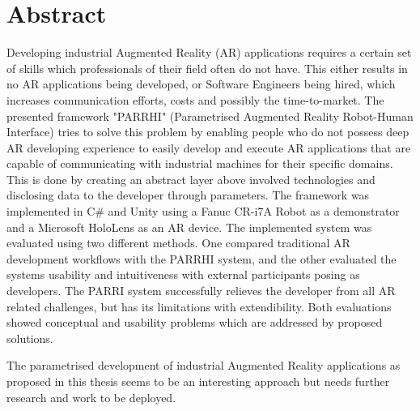 \chapter*{Abstract}\label{Chap:Abstract}

Developing industrial Augmented Reality (AR) applications requires a certain set of skills which professionals of their field often do not have. This either results in no AR applications being developed, or Software Engineers being hired, which increases communication efforts, costs and possibly the time-to-market. The presented framework "PARRHI" (Parametrised Augmented Reality Robot-Human Interface) tries to solve this problem by enabling people who do not possess deep AR developing experience to easily develop and execute AR applications that are capable of communicating with industrial machines for their specific domains. This is done by creating an abstract layer above involved technologies and disclosing data to the developer through parameters. The framework was implemented in C\# and Unity using a Fanuc CR-i7A Robot as a demonstrator and a Microsoft HoloLens as an AR device. The implemented system was evaluated using two different methods. One compared traditional AR development workflows with the PARRHI system, and the other evaluated the systems usability and intuitiveness with external participants posing as developers. The PARRI system successfully relieves the developer from all AR related challenges, but has its limitations with extendibility. Both evaluations showed conceptual and usability problems which are addressed by proposed solutions.

The parametrised development of industrial Augmented Reality applications as proposed in this thesis seems to be an interesting approach but needs further research and work to be deployed.
